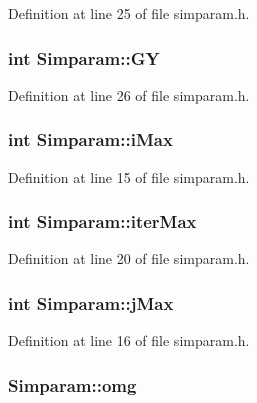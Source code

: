 Definition at line 25 of file simparam.\-h.

\hypertarget{struct_simparam_a8eb58296cc754b83c07616efb2a0ee24}{
\subsubsection[{G\-Y}]{\setlength{\rightskip}{0pt plus 5cm}int Simparam\-::\-G\-Y}}\label{d6/d1d/struct_simparam_a8eb58296cc754b83c07616efb2a0ee24}


Definition at line 26 of file simparam.\-h.

\hypertarget{struct_simparam_a5f7e2ae23f38be14f693fb437058cdf5}{
\subsubsection[{i\-Max}]{\setlength{\rightskip}{0pt plus 5cm}int Simparam\-::i\-Max}}\label{d6/d1d/struct_simparam_a5f7e2ae23f38be14f693fb437058cdf5}


Definition at line 15 of file simparam.\-h.

\hypertarget{struct_simparam_a0a20db5558bc0fc25e3431e04171312c}{
\subsubsection[{iter\-Max}]{\setlength{\rightskip}{0pt plus 5cm}int Simparam\-::iter\-Max}}\label{d6/d1d/struct_simparam_a0a20db5558bc0fc25e3431e04171312c}


Definition at line 20 of file simparam.\-h.

\hypertarget{struct_simparam_ae52e9540a64a6e419554a7ebd77df83b}{
\subsubsection[{j\-Max}]{\setlength{\rightskip}{0pt plus 5cm}int Simparam\-::j\-Max}}\label{d6/d1d/struct_simparam_ae52e9540a64a6e419554a7ebd77df83b}


Definition at line 16 of file simparam.\-h.

\hypertarget{struct_simparam_a4097676bbe9c22c0d591d0a38a92db1f}{
\subsubsection[{omg}]{ Simparam\-::omg}}\label{d6/d1d/struct_simparam_a4097676bbe9c22c0d591d0a38a92db1f}


